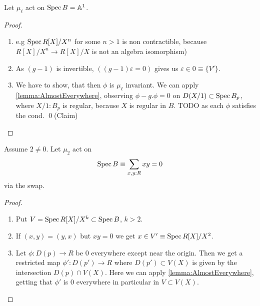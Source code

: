 \begin{example}
	Let $\mu_\ell$ act on $\operatorname{Spec} B = \mathbb{A}^1$.
\end{example}
\begin{proof}
	\begin{enumerate}
		\item e.g $\operatorname{Spec} R[X] / X^n$ for some $n >1$ is non contractible, because $R[X] / X^n \to R[X] / X$ is not an algebra isomorphism)
		\item As $(g-1)$ is invertible, $ ((g-1)\varepsilon = 0) $  gives us $\varepsilon \in 0 \equiv \{V'\}$.
		\item 	We have to show, that then $\phi$ is $\mu_{\ell}$ invariant. We can apply  \ref{lemma:AlmostEverywhere}, observing $\phi - g.\phi = 0$ on $D(X / 1) \subset \operatorname{Spec} B_p$, where $X/1 : B_p$ is regular, because $X$ is regular in $B$. TODO as each $\phi$ satisfies the cond. \qed(Claim)\\
	
	\end{enumerate}
\end{proof}
\begin{example}
	Assume $2 \neq 0$. Let $\mu_2$ act on
	\[
	\operatorname{Spec} B \equiv \sum_{x , y : R} x y = 0
	\]
	via the swap.
\end{example}
\begin{proof}
	\begin{enumerate}
		\item Put $V = \operatorname{Spec} R[X] / X^k \subset \operatorname{Spec} B$, $k > 2$.
		\item If $(x,y) = (y,x)$ but $x y = 0$ we get $x \in V' \equiv \operatorname{Spec} R[X] / X^2$.
		\item Let $\phi: D(p) \to R$ be 0 everywhere except near the origin. Then we get a restricted map $\phi' : D(p') \to R$ where $D(p') \subset V(X)$ is given by the intersection $D(p) \cap V(X) $. Here we can apply \ref{lemma:AlmostEverywhere}, getting that $\phi'$ is 0 everywhere in particular in $V \subset V(X)$.
	\end{enumerate}
\end{proof}



